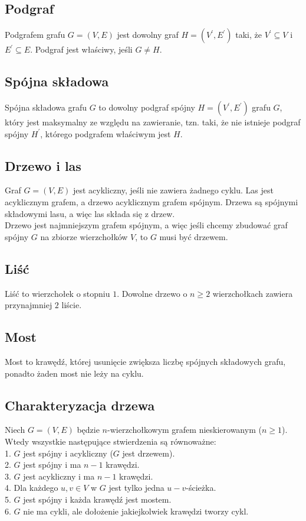 \subsection*{Podgraf}
Podgrafem grafu $G = (V, E)$ jest dowolny graf $H = (V^\prime, E^\prime)$ taki,
że $V^\prime \subseteq V$ i $E^\prime \subseteq E$. Podgraf jest właściwy, jeśli
$G \neq H$.

\subsection*{Spójna składowa}
Spójna składowa grafu $G$ to dowolny podgraf spójny $H = (V^\prime, E^\prime)$
grafu $G$, który jest maksymalny ze względu na zawieranie, tzn. taki, że nie
istnieje podgraf spójny $H^\prime$, którego podgrafem właściwym jest $H$.

\subsection*{Drzewo i las}
Graf $G = (V, E)$ jest acykliczny, jeśli nie zawiera żadnego cyklu. Las jest
acyklicznym grafem, a drzewo acyklicznym grafem spójnym. Drzewa są spójnymi
składowymi lasu, a więc las składa się z drzew. \\
Drzewo jest najmniejszym grafem spójnym, a więc jeśli chcemy zbudować graf
spójny $G$ na zbiorze wierzchołków $V$, to $G$ musi być drzewem.

\subsection*{Liść}
Liść to wierzchołek o stopniu $1$. Dowolne drzewo o $n \geq 2$ wierzchołkach 
zawiera przynajmniej $2$ liście.

\subsection*{Most}
Most to krawędź, której usunięcie zwiększa liczbę spójnych składowych grafu,
ponadto żaden most nie leży na cyklu.

\subsection*{Charakteryzacja drzewa}
Niech $G = (V, E)$ będzie $n$-wierzchołkowym grafem nieskierowanym ($n \geq 1$).
Wtedy wszystkie następujące stwierdzenia są równoważne: \\
1. $G$ jest spójny i acykliczny ($G$ jest drzewem). \\
2. $G$ jest spójny i ma $n-1$ krawędzi. \\
3. $G$ jest acykliczny i ma $n-1$ krawędzi. \\
4. Dla każdego $u, v \in V$ w $G$ jest tylko jedna $u-v$-ścieżka. \\
5. $G$ jest spójny i każda krawędź jest mostem. \\
6. $G$ nie ma cykli, ale dołożenie jakiejkolwiek krawędzi tworzy cykl.

